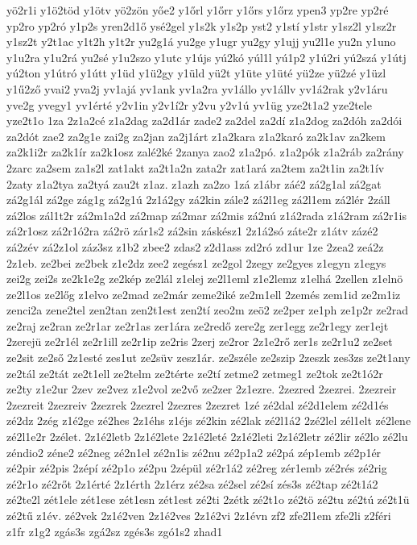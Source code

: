 {yö2r1i
y1ö2töd
y1ötv
yö2zön
yőe2
y1őrl
y1őrr
y1őrs
y1őrz
ypen3
yp2re
yp2ré
yp2ro
yp2ró
y1p2s
yren2d1ő
ysé2gel
y1s2k
y1s2p
yst2
y1stí
y1str
y1sz2l
y1sz2r
y1sz2t
y2t1ac
y1t2h
y1t2r
yu2g1á
yu2ge
y1ugr
yu2gy
y1ujj
yu2l1e
yu2n
y1uno
y1u2ra
y1u2rá
yu2sé
y1u2szo
y1utc
y1újs
yú2kó
yúl1l
yú1p2
y1ú2ri
yú2szá
y1útj
yú2ton
y1útró
y1útt
y1üd
y1ü2gy
y1üld
yü2t
y1üte
y1üté
yü2ze
yü2zé
y1üzl
y1ű2ző
yvai2
yva2j
yv1ajá
yv1ank
yv1a2ra
yv1állo
yv1állv
yv1á2rak
y2v1áru
yve2g
yvegy1
yv1érté
y2v1in
y2v1í2r
y2vu
y2v1ú
yv1üg
yze2t1a2
yze2tele
yze2t1o
1za
2z1a2cé
z1a2dag
za2d1ár
zade2
za2del
za2dí
z1a2dog
za2dóh
za2dói
za2dót
zae2
za2g1e
zai2g
za2jan
za2j1árt
z1a2kara
z1a2karó
za2k1av
za2kem
za2k1i2r
za2k1ír
za2k1osz
zalé2ké
2zanya
zao2
z1a2pó.
z1a2pók
z1a2ráb
za2rány
2zarc
za2sem
za1s2l
zat1akt
za2t1a2n
zata2r
zat1ará
za2tem
za2t1in
za2t1ív
2zaty
z1a2tya
za2tyá
zau2t
z1az.
z1azh
za2zo
1zá
z1ábr
záé2
zá2g1al
zá2gat
zá2g1ál
zá2ge
zág1g
zá2g1ú
2z1á2gy
zá2kin
zále2
zá2l1eg
zá2l1em
zá2lér
2záll
zá2los
zál1t2r
zá2m1a2d
zá2map
zá2mar
zá2mis
zá2nú
z1á2rada
z1á2ram
zá2r1is
zá2r1osz
zá2r1ó2ra
zá2rö
zár1s2
zá2sin
záskész1
2z1á2só
záte2r
z1átv
zázé2
zá2zév
zá2z1ol
záz3sz
z1b2
zbee2
zdas2
z2d1ass
zd2ró
zd1ur
1ze
2zea2
zeá2z
2z1eb.
ze2bei
ze2bek
z1e2dz
zee2
zegész1
ze2gol
2zegy
ze2gyes
z1egyn
z1egys
zei2g
zei2s
ze2k1e2g
ze2kép
ze2lál
z1elej
ze2l1eml
z1e2lemz
z1elhá
2zellen
z1elnö
ze2l1os
ze2lőg
z1elvo
ze2mad
ze2már
zeme2iké
ze2m1ell
2zemés
zem1id
ze2m1iz
zenci2a
zene2tel
zen2tan
zen2t1est
zen2tí
zeo2m
zeö2
ze2per
ze1ph
ze1p2r
ze2rad
ze2raj
ze2ran
ze2r1ar
ze2r1as
zer1ára
ze2redő
zere2g
zer1egg
ze2r1egy
zer1ejt
2zerejü
ze2r1él
ze2r1ill
ze2r1ip
ze2ris
2zerj
ze2ror
2z1e2rő
zer1s
ze2r1u2
ze2set
ze2sit
ze2ső
2z1esté
zes1ut
ze2süv
zesz1ár.
ze2széle
ze2szip
2zeszk
zes3zs
ze2t1any
ze2tál
ze2tát
ze2t1ell
ze2telm
ze2térte
ze2tí
zetme2
zetmeg1
ze2tok
ze2t1ó2r
ze2ty
z1e2ur
2zev
ze2vez
z1e2vol
ze2vő
ze2zer
2z1ezre.
2zezred
2zezrei.
2zezreir
2zezreit
2zezreiv
2zezrek
2zezrel
2zezres
2zezret
1zé
zé2dal
zé2d1elem
zé2d1és
zé2dz
2zég
z1é2ge
zé2hes
2z1éhs
z1éjs
zé2kin
zé2lak
zé2l1á2
2zé2lel
zél1elt
zé2lene
zé2l1e2r
2zélet.
2z1é2letb
2z1é2lete
2z1é2leté
2z1é2leti
2z1é2letr
zé2lir
zé2lo
zé2lu
zéndio2
zéne2
zé2neg
zé2n1el
zé2n1is
zé2nu
zé2p1a2
zé2pá
zép1emb
zé2p1ér
zé2pir
zé2pis
2zépí
zé2p1o
zé2pu
2zépül
zé2r1á2
zé2reg
zér1emb
zé2rés
zé2rig
zé2r1o
zé2rőt
2z1érté
2z1érth
2z1érz
zé2sa
zé2sel
zé2sí
zés3s
zé2tap
zé2t1á2
zé2te2l
zét1ele
zét1ese
zét1esn
zét1est
zé2ti
2zétk
zé2t1o
zé2tö
zé2tu
zé2tú
zé2t1ü
zé2tű
z1év.
zé2vek
2z1é2ven
2z1é2ves
2z1é2vi
2z1évn
zf2
zfe2l1em
zfe2li
z2féri
z1fr
z1g2
zgás3s
zgá2sz
zgés3s
zgó1s2
zhad1
}
